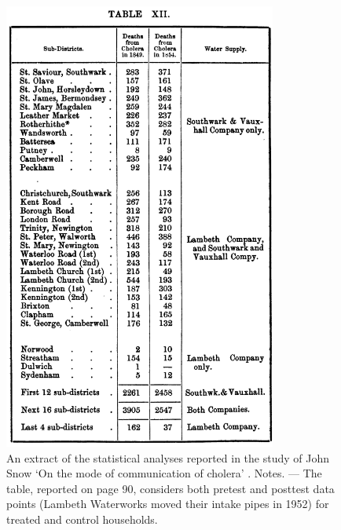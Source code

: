 \documentclass[11pt]{article}
\begin{document}
\begin{refsection}
\begin{figure}
\begin{small}
\begin{center}
\includegraphics[width=0.8\textwidth]{exhibits/snow_natural_experiment.png}
    \end{center}
    \caption{An extract of the statistical analyses reported in the study of
    John Snow `On the mode of communication of cholera' \autocite*{snow_1855}.
    Notes. --- The table, reported on page 90, considers both pretest and posttest
    data points (Lambeth Waterworks moved their intake pipes in 1952) for 
    treated and control households.}
    \label{fig:snow_natural_experiment}
  \end{small}
\end{figure}


\end{refsection}
\end{document}
